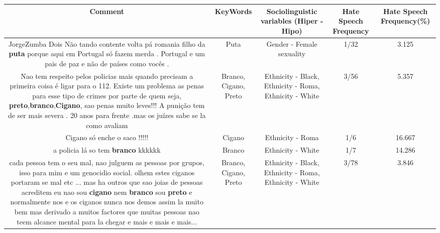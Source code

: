 \documentclass[11pt]{article}
\newlength\mylength
\begin{document}
\begin{center}
\setlength\mylength{\dimexpr\textwidth - 1\arrayrulewidth - 50\tabcolsep}
\begin{longtable}{|C{.65\mylength}|C{.30\mylength}|C{.12\mylength}|C{.12\mylength}|C{.12\mylength}|}
\hline
\textbf{Comment} & \textbf{KeyWords} & \textbf{Sociolinguistic variables (Hiper - Hipo)}  & \textbf{Hate Speech Frequency} & \textbf{Hate Speech Frequency(\%)} \\
\hline{}\small JorgeZumba Dois Não tando contente volta pá romania filho da \textbf{puta} porque aqui em Portugal só fazem merda . Portugal e um pais de paz e não de países como vocês .\normalsize   & Puta & Gender - Female sexuality & 1/32 & 3.125 \\  \hline
  \small Nao tem respeito pelos policias mais quando precisam a primeira coisa é ligar para o 112. Existe um problema as penas para esse tipo de crimes por parte de quem seja, \textbf{preto},\textbf{branco},\textbf{Cigano}, sao penas muito leves!!!  A punição tem de ser mais severa . 20 anos para frente .mas os juízes sabe se la como avaliam\normalsize   & Branco, Cigano, Preto & Ethnicity - Black, Ethnicity - Roma, Ethnicity - White & 3/56 & 5.357 \\  \hline
  \small Cigano só enche o saco !!!!!\normalsize   & Cigano & Ethnicity - Roma & 1/6 & 16.667 \\  \hline
  \small a policia lá so tem \textbf{branco}  kkkkkk\normalsize   & Branco & Ethnicity - White & 1/7 & 14.286 \\  \hline
  \small cada pessoa tem o seu mal, nao julguem as pessoas por grupos, isso para mim e um genocidio social. olhem estes ciganos portaram se mal etc ... mas ha outros que sao joias de pessoas acreditem eu nao sou \textbf{cigano} nem \textbf{branco} sou \textbf{preto} e  normalmente nos e os ciganos nunca nos demos assim la muito bem mas derivado a muitos factores que muitas pessoas nao teem alcance mental para la chegar e mais e mais e mais...\normalsize   & Branco, Cigano, Preto & Ethnicity - Black, Ethnicity - Roma, Ethnicity - White & 3/78 & 3.846 \\  \hline

\end{longtable}
\end{center}
\end{document}
